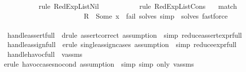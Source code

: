 \begin{isabellebody}
\ \ \ \ \ \ \ \ \ \ rule\ RedExpListNil\ {\isacharbar}{\kern0pt}\isanewline
\ \ \ \ \ \ \ \ \ \ rule\ RedExpListCons{\isacharparenright}{\kern0pt}{\isacharparenright}{\kern0pt}\ {\isacharbar}{\kern0pt}\isanewline
\ \ {\isacharparenleft}{\kern0pt}{\isacharparenleft}{\kern0pt}match\ \ \ \isanewline
\ \ \ \ \ \ \ \ \ \ \ \ \ \ \ \ \ \ \ \ \ \ \ {\isachardoublequoteopen}{\isacharquery}{\kern0pt}R\ {\isacharequal}{\kern0pt}\ Some\ {\isacharquery}{\kern0pt}x{\isachardoublequoteclose}\ {\isasymRightarrow}\ {\isacartoucheopen}fail{\isacharquery}{\kern0pt}{\isacartoucheclose}{\isacharparenright}{\kern0pt}{\isacharcomma}{\kern0pt}\ {\isacharparenleft}{\kern0pt}solves\ simp\ {\isacharbar}{\kern0pt}\ solves\ fastforce{\isacharparenright}{\kern0pt}\ {\isacharparenright}{\kern0pt}\isanewline
\ \isanewline
\ \ \ \ \ {\isacharparenright}{\kern0pt}{\isacharplus}{\kern0pt}\isanewline
\isanewline
{}\isamarkupfalse%
\ handle{\isacharunderscore}{\kern0pt}assert{\isacharunderscore}{\kern0pt}full\ {\isacharequal}{\kern0pt}\ {\isacharparenleft}{\kern0pt}drule\ assert{\isacharunderscore}{\kern0pt}correct{\isacharunderscore}{\kern0pt}{}{\isacharcomma}{\kern0pt}\ {\isacharparenleft}{\kern0pt}assumption\ {\isacharbar}{\kern0pt}\ simp{\isacharparenright}{\kern0pt}{\isacharquery}{\kern0pt}{\isacharcomma}{\kern0pt}\ reduce{\isacharunderscore}{\kern0pt}assert{\isacharunderscore}{\kern0pt}expr{\isacharunderscore}{\kern0pt}full{\isacharparenright}{\kern0pt}\isanewline
\isanewline
\isanewline
{}\isamarkupfalse%
\ handle{\isacharunderscore}{\kern0pt}assign{\isacharunderscore}{\kern0pt}full\ {\isacharequal}{\kern0pt}\ {\isacharparenleft}{\kern0pt}erule\ single{\isacharunderscore}{\kern0pt}assign{\isacharunderscore}{\kern0pt}cases{\isacharcomma}{\kern0pt}\ {\isacharparenleft}{\kern0pt}assumption\ {\isacharbar}{\kern0pt}\ simp{\isacharparenright}{\kern0pt}{\isacharcomma}{\kern0pt}\ reduce{\isacharunderscore}{\kern0pt}expr{\isacharunderscore}{\kern0pt}full{\isacharparenright}{\kern0pt}\isanewline
\isanewline
{}\isamarkupfalse%
\ handle{\isacharunderscore}{\kern0pt}havoc{\isacharunderscore}{\kern0pt}full\ \ v{\isacharunderscore}{\kern0pt}assms\ {\isacharequal}{\kern0pt}\ \isanewline
{\isacharparenleft}{\kern0pt}erule\ havoc{\isacharunderscore}{\kern0pt}cases{\isacharunderscore}{\kern0pt}no{\isacharunderscore}{\kern0pt}cond{\isacharcomma}{\kern0pt}\ {\isacharparenleft}{\kern0pt}assumption\ {\isacharbar}{\kern0pt}\ simp{\isacharparenright}{\kern0pt}{\isacharcomma}{\kern0pt}\ {\isacharparenleft}{\kern0pt}simp\ only{\isacharcolon}{\kern0pt}\ v{\isacharunderscore}{\kern0pt}assms{\isacharparenright}{\kern0pt}{\isacharcomma}{\kern0pt}\isanewline

\end{isabellebody}
